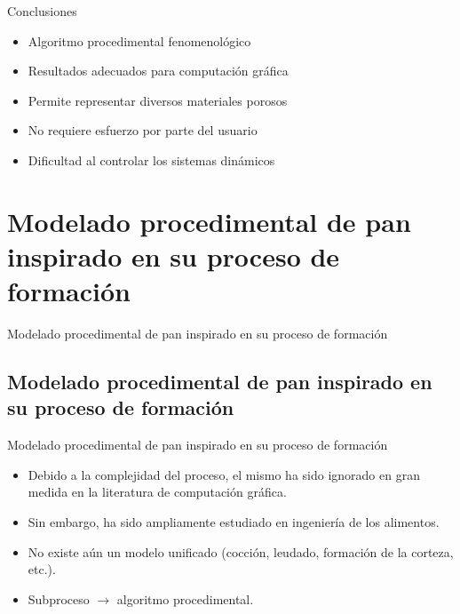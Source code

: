 \documentclass[spanish,unknownkeysallowed]{beamer}
\begin{document}
\begin{frame}{Conclusiones}
\begin{block}{}
\begin{itemize}
\item Algoritmo procedimental fenomenológico
\item Resultados adecuados para computación gráfica
\item Permite representar diversos materiales porosos
\item No requiere esfuerzo por parte del usuario

\item Dificultad al controlar los sistemas dinámicos
\end{itemize}
\end{block}
\end{frame}


\section[Modelado de Pan]{Modelado procedimental de pan inspirado en su proceso de formación}


\begin{frame}
\begin{block}{}
\begin{center}
\vspace{1cm}
\huge{Modelado procedimental de pan inspirado en su proceso de formación}
\vspace{1cm}
\end{center}
\end{block}
\end{frame}

\subsection{Modelado procedimental de pan inspirado en su proceso de formación}
\begin{frame}{Modelado procedimental de pan inspirado en su proceso de formación}
\begin{block}{}
\begin{itemize}
\item Debido a la complejidad del proceso, el mismo ha sido ignorado en gran medida en la literatura de computación gráfica.

\item Sin embargo, ha sido ampliamente estudiado en ingeniería de los alimentos.

\item No existe aún un modelo unificado (cocción, leudado, formación de la corteza, etc.).

\item Subproceso $\rightarrow$ algoritmo procedimental.
\end{itemize}
\end{block}
\end{frame}
\end{document}
